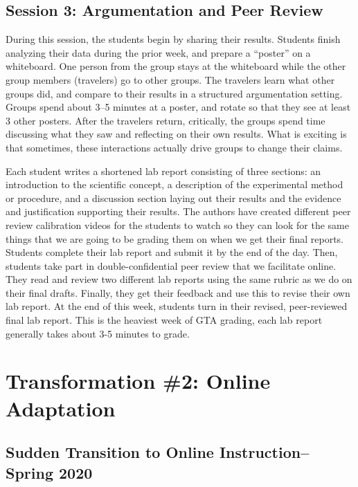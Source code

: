 \documentclass[aip, numerical, preprint]{revtex4-2}
\begin{document}
\subsection{Session 3: Argumentation and Peer Review}
During this session, the students begin by sharing their results.  Students finish analyzing
their data during the prior week, and prepare a ``poster'' on a whiteboard.  One person from
the group stays at the whiteboard while the other group members (travelers) go to other groups.
The travelers learn what other groups did, and compare to their results in a structured
argumentation setting.  Groups spend about 3--5 minutes at a poster, and rotate so that they
see at least 3 other posters.  After the travelers return, critically, the groups spend time
discussing what they saw and reflecting on their own results.  What is exciting is that
sometimes, these interactions actually drive groups to change their claims.\citep{Walker2019}

Each student writes a shortened lab report consisting of three sections: an introduction to the
scientific concept, a description of the experimental method or procedure, and a discussion
section laying out their results and the evidence and justification supporting their results.
The authors have created different peer review calibration videos for the students to watch so
they can look for the same things that we are going to be grading them on when we get their
final reports.  Students complete their lab report and submit it by the end of the day.  Then,
students take part in double-confidential peer review that we facilitate online.  They read and
review two different lab reports using the same rubric as we do on their final drafts.
Finally, they get their feedback and use this to revise their own lab report.  At the end of
this week, students turn in their revised, peer-reviewed final lab report.  This is the
heaviest week of GTA grading, each lab report generally takes about 3-5 minutes to grade.

\section{Transformation \#2: Online Adaptation}

\subsection{Sudden Transition to Online Instruction--Spring 2020}
\end{document}
